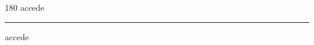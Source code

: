 
\begin{frame}
\begin{center}
\begin{turn}{180}
{\fontsize{2.5cm}{1em}\selectfont accede}
\end{turn}
\vspace{1em}\par  
\hrule
\vspace{1em}\par  
{\fontsize{2.5cm}{1em}\selectfont accede}
\end{center}
\end{frame}
